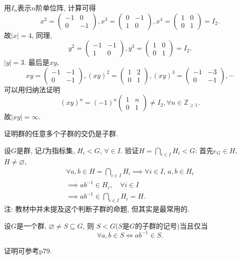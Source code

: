 \begin{solution}
    用$I_n$表示$n$阶单位阵, 计算可得
\[
x^2 = \begin{pmatrix} 
    -1 & 0 \\
    0 & -1
\end{pmatrix},
x^3 = \begin{pmatrix}
    0 & -1 \\
    1 & 0
\end{pmatrix},
x^4 = \begin{pmatrix}
    1 & 0 \\
    0 & 1
\end{pmatrix} = I_2.
\]
故$|x| = 4$, 同理,
\[
y^2 = \begin{pmatrix}
    -1 & -1 \\
    1 & 0
\end{pmatrix},
y^3 = \begin{pmatrix}
    1 & 0 \\
    0 & 1
\end{pmatrix} = I_2.
\]
$|y| = 3$.
最后是$xy$,
\[
xy = \begin{pmatrix}
    -1 & -1 \\
    0 & -1
\end{pmatrix},
(xy)^2 = \begin{pmatrix}
    1 & 2 \\
    0 & 1
\end{pmatrix},
(xy)^3 = \begin{pmatrix}
    -1 & -3 \\
    0 & -1
\end{pmatrix}, \cdots
\]
可以用归纳法证明
\[
    (xy)^n = (-1)^n\begin{pmatrix}
        1 & n \\
        0 & 1
    \end{pmatrix} \neq I_2, \forall n \in \mathbb{Z}_{\geqslant 1}.
\]
故$|xy| = \infty$.
\end{solution}
    
\begin{problem}
    证明群的任意多个子群的交仍是子群.
\end{problem}

\begin{solution}
    设$G$是群, 记$I$为指标集, $H_i < G,\, \forall \in I$.
验证\(H = \displaystyle\bigcap_{i \in I} H_i < G\): 首先$e_G \in H$, $H \neq \varnothing$,
\[
\begin{gathered}
    \forall a, b \in H = \bigcap_{i \in I} H_i \implies \forall i \in I,\,a, b \in H_i\\
    \implies ab^{-1} \in H_i, \quad \forall i \in I\\
    \implies ab^{-1} \in \bigcap_{i \in I} H_i = H.
\end{gathered}
\]
注: 教材中并未提及这个判断子群的命题, 但其实是最常用的.

\begin{propstar}[子群的判定]
    设$G$是一个群, $\varnothing \neq S \subseteq G$, 则
$S < G$($S$是$G$的子群的记号)当且仅当
\[
    \forall a, b \in S \iff ab^{-1} \in S.
\]
\end{propstar}
证明可参考\cite{aluffi2009algebra}p79.
\end{solution}